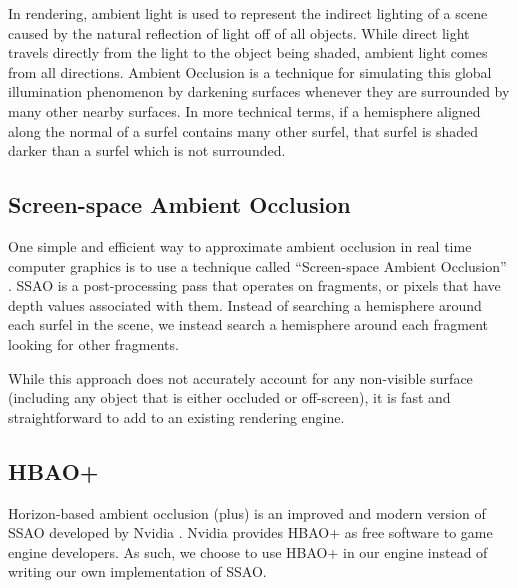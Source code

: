 In rendering, ambient light is used to represent the indirect lighting of a scene caused by the natural reflection of light off of all objects.
While direct light travels directly from the light to the object being shaded, ambient light comes from all directions.
Ambient Occlusion is a technique for simulating this global illumination phenomenon by darkening surfaces whenever they are surrounded by many other nearby surfaces.
In more technical terms, if a hemisphere aligned along the normal of a surfel contains many other surfel, that surfel is shaded darker than a surfel which is not surrounded.

\subsection{Screen-space Ambient Occlusion}

One simple and efficient way to approximate ambient occlusion in real time computer graphics is to use a technique called ``Screen-space Ambient Occlusion'' \cite{ssao}.
SSAO is a post-processing pass that operates on fragments, or pixels that have depth values associated with them.
Instead of searching a hemisphere around each surfel in the scene, we instead search a hemisphere around each fragment looking for other fragments.

While this approach does not accurately account for any non-visible surface (including any object that is either occluded or off-screen), it is fast and straightforward to add to an existing rendering engine.


\subsection{HBAO+}

Horizon-based ambient occlusion (plus) is an improved and modern version of SSAO developed by Nvidia \cite{hbao}.
Nvidia provides HBAO+ as free software to game engine developers.
As such, we choose to use HBAO+ in our engine instead of writing our own implementation of SSAO.
